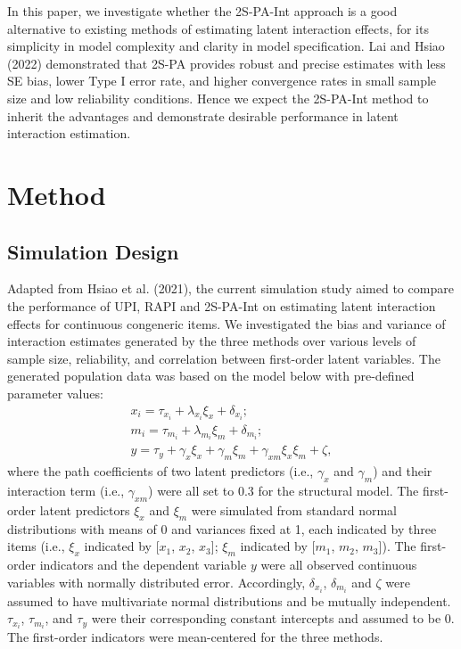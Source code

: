 \documentclass[
  man]{apa6}
\begin{document}
In this paper, we investigate whether the 2S-PA-Int approach is a good alternative to existing methods of estimating latent interaction effects, for its simplicity in model complexity and clarity in model specification. Lai and Hsiao (2022) demonstrated that 2S-PA provides robust and precise estimates with less SE bias, lower Type I error rate, and higher convergence rates in small sample size and low reliability conditions. Hence we expect the 2S-PA-Int method to inherit the advantages and demonstrate desirable performance in latent interaction estimation.

\section{Method}\label{method}

\subsection{Simulation Design}\label{simulation-design}

Adapted from Hsiao et al. (2021), the current simulation study aimed to compare the performance of UPI, RAPI and 2S-PA-Int on estimating latent interaction effects for continuous congeneric items. We investigated the bias and variance of interaction estimates generated by the three methods over various levels of sample size, reliability, and correlation between first-order latent variables. The generated population data was based on the model below with pre-defined parameter values:
\begin{equation}
\begin{gathered}
x_{i} =  \tau_{x_{i}} + \lambda_{x_{i}}\xi_{x} + \delta_{x_{i}};\\
m_{i} =  \tau_{m_{i}} + \lambda_{m_{i}}\xi_{m} + \delta_{m_{i}};\\
y =  \tau_{y} + \gamma_{x}\xi_{x} + \gamma_{m}\xi_{m} + \gamma_{xm}\xi_{x}\xi_{m} + \zeta,
\end{gathered}
\end{equation}
where the path coefficients of two latent predictors (i.e., \(\gamma_{x}\) and \(\gamma_{m}\)) and their interaction term (i.e., \(\gamma_{xm}\)) were all set to 0.3 for the structural model. The first-order latent predictors \(\xi_{x}\) and \(\xi_{m}\) were simulated from standard normal distributions with means of 0 and variances fixed at 1, each indicated by three items (i.e., \(\xi_{x}\) indicated by {[}\(x_{1}\), \(x_{2}\), \(x_{3}\){]}; \(\xi_{m}\) indicated by {[}\(m_{1}\), \(m_{2}\), \(m_{3}\){]}). The first-order indicators and the dependent variable \(y\) were all observed continuous variables with normally distributed error. Accordingly, \(\delta_{x_{i}}\), \(\delta_{m_{i}}\) and \(\zeta\) were assumed to have multivariate normal distributions and be mutually independent. \(\tau_{x_{i}}\), \(\tau_{m_{i}}\), and \(\tau_{y}\) were their corresponding constant intercepts and assumed to be 0. The first-order indicators were mean-centered for the three methods.
\end{document}

